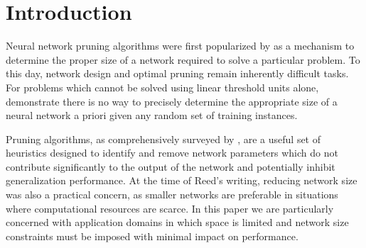 \section{Introduction}
Neural network pruning algorithms were first popularized by \cite{sietsma1988neural} as a mechanism to determine the proper size of a network required to solve a particular problem. To this day, network design and optimal pruning remain inherently difficult tasks. For problems which cannot be solved using linear threshold units alone, \cite{baum1989size} demonstrate there is no way to precisely determine the appropriate size of a neural network a priori given any random set of training instances. %

Pruning algorithms, as comprehensively surveyed by \cite{reed1993pruning}, are a useful set of heuristics designed to identify and remove network parameters which do not contribute significantly to the output of the network and potentially inhibit generalization performance. At the time of Reed's writing, reducing network size was also a practical concern, as smaller networks are preferable in situations where computational resources are scarce. In this paper we are particularly concerned with application domains in which space is limited and network size constraints must be imposed with minimal impact on performance.
